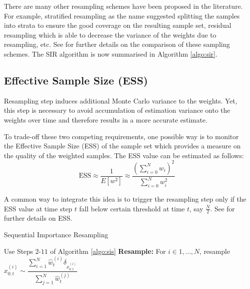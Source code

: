 There are many other resampling schemes have been proposed in the literature. For example, stratified resampling \cite{KG96} as the name suggested splitting the samples into strata to ensure the good coverage on the resulting sample set, residual resampling \cite{JSL98} which is able to decrease the variance of the weights due to resampling, etc. See \cite{DR05} for further details on the comparison of these sampling schemes.  The SIR algorithm is now summarised in Algorithm \ref{algo:sir}.

\subsection{Effective Sample Size (ESS)}
\label{sec:ess}
Resampling step induces additional Monte Carlo variance to the weights. Yet, this step is necessary to avoid accumulation of estimation variance onto the weights over time and therefore results in a more accurate estimate.

To trade-off these two competing requirements, one possible way is to monitor the Effective Sample Size (ESS) of the sample set which provides a measure on the quality of the weighted samples. The ESS value can be estimated as follows:
\begin{equation}
  \text{ESS} \approx \dfrac{1}{E[w^2]} \approx \dfrac{\left(\sum^N_{i=0} w_i \right)^2}{\sum^N_{i=0}w_i^2}
\end{equation}

A common way to integrate this idea is to trigger the resampling step only if the ESS value at time step $t$ fall below certain threshold at time $t$, say $\frac{N}{2}$. See \cite{JAM10} for further details on ESS.

\begin{algorithm}
\caption{Sequential Importance Resampling}\label{algo:sir}
\begin{algorithmic}[1]
\State Use Steps $2$-$11$ of Algorithm \ref{algo:sis}
\State \textbf{Resample:} For $i \in 1, \ldots, N$, resample $ x^{(i)}_{0:t} \sim \dfrac{\sum^N_{i=1}\hat{w}^{(i)}_t\delta_{x^{(i)}_{0:t}}}{\sum^N_{j=1} \hat{w}^{(j)}_t}$
\EndFunction
\end{algorithmic}
\end{algorithm}

